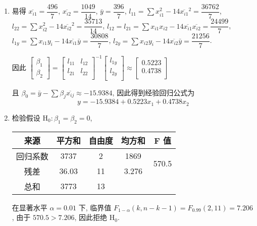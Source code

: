 \begin{enumerate}[(1)]
    \item 
    易得 $\overline{x_{i1}}=\dfrac{496}{7}$, 
    $\overline{x_{i2}}=\dfrac{1049}{14}$, 
    $\bar{y}=\dfrac{396}{7}$, $l_{11}=\sum x_{i1}^2-14\overline{x_{i1}}^2=\dfrac{36762}{7}$, 
    $l_{22}=\sum x_{i2}^2-14\overline{x_{i2}}^2=\dfrac{35713}{14}$, 
    $l_{12}=l_{21}=\sum x_{i1}x_{i2}-14\overline{x_{i1}}\overline{x_{i2}}=\dfrac{24499}{7}$, 
    $l_{1y}=\sum x_{i1}y_{i}-14\overline{x_{i1}}\bar{y}=\dfrac{30808}{7}$,
    $l_{2y}=\sum x_{i2}y_i-14\overline{x_{i2}}\bar{y}=\dfrac{21256}{7}$.
    
    因此 $\begin{bmatrix}
        \beta_1\\\beta_2
    \end{bmatrix}=\begin{bmatrix}
        l_{11}&l_{12}\\
        l_{21}&l_{22}\\
    \end{bmatrix}^{-1}\begin{bmatrix}
        l_{1y}\\l_{2y}\\
    \end{bmatrix}\approx\begin{bmatrix}
        0.5223\\0.4738\\
    \end{bmatrix}$
    
    且 $\beta_0=\bar{y}-\sum\beta_j\overline{x_{ij}}\approx -15.9384$, 因此得到经验回归公式为
    $$
    y= -15.9384 + 0.5223 x_{1} + 0.4738 x_2
    $$

    \item 
    检验假设 $\text{H}_0 :\beta_1=\beta_2=0$,

    \begin{center}
        \begin{tabular}{c|c|c|cc}
        \hline
        来源   & 平方和   & 自由度 & \multicolumn{1}{c|}{均方和}   & F 值                    \\ \hline
        回归系数 & 3737  & 2   & \multicolumn{1}{c|}{1869}  & \multirow{2}{*}{570.5} \\
        残差   & 36.03 & 11  & \multicolumn{1}{c|}{3.276} &                        \\ \hline
        总和   & 3773  & 13  &                            &                        \\ \hline
        \end{tabular}
    \end{center}
    在显著水平 $\alpha=0.01$ 下, 临界值 $F_{1-\alpha}(k,n-k-1)=F_{0.99}(2,11)=7.206$, 由于 $570.5>7.206$, 因此拒绝 $\text{H}_0$.
    

\end{enumerate}
